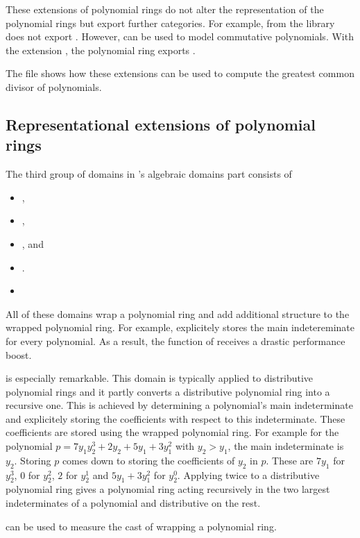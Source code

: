 These extensions of polynomial rings do not alter the representation of the polynomial rings but export further categories. For example,  from the \LibAlgebra library does not export . However,  can be used to model commutative polynomials. With the extension , the polynomial ring exports .

The file  shows how these extensions can be used to compute the greatest common divisor of polynomials.




\subsection{Representational extensions of polynomial rings}

The third group of domains in \LibCharSet's algebraic domains part consists of
\begin{itemize}
\item {},
\item {},
\item {}, and
\item {}.
\item {}
\end{itemize}

All of these domains wrap a polynomial ring and add additional structure to the wrapped polynomial ring. For example,  explicitely stores the main indetereminate for every polynomial. As a result, the function  of  receives a drastic performance boost.

 is especially remarkable. This domain is typically applied to distributive polynomial rings and it partly converts a distributive polynomial ring into a recursive one. This is achieved by determining a polynomial's main indeterminate and explicitely storing the coefficients with respect to this indeterminate. These coefficients are stored using the wrapped polynomial ring. For example for the polynomial $p = 7y_1y_2^3+2y_2+5y_1+3y_1^2$ with $y_2>y_1$, the main indeterminate is $y_2$. Storing $p$ comes down to storing the coefficients of $y_2$ in $p$. These are $7y_1$ for $y_2^3$, $0$ for $y_2^2$, $2$ for $y_2^1$ and $5y_1+3y_1^2$ for $y_2^0$. Applying  twice to a distributive polynomial ring gives a polynomial ring acting recursively in the two largest indeterminates of a polynomial and distributive on the rest.

 can be used to measure the cast of wrapping a polynomial ring.